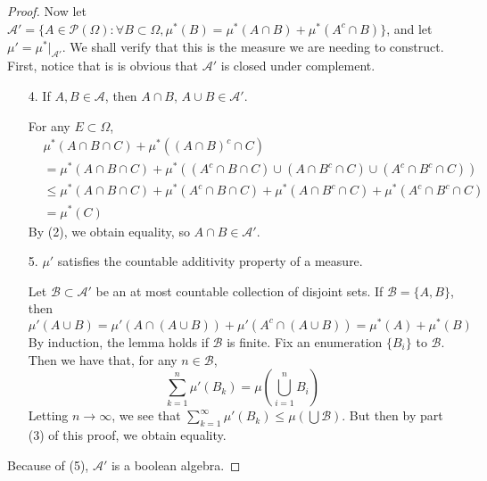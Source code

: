\begin{proof}
    Now let $\mathcal{A}' = \{ A \in \mathcal{P}(\Omega) : \forall B \subset \Omega, \mu^*(B) = \mu^*(A \cap B) + \mu^*(A^c \cap B) \}$, and let $\mu' = \mu^*|_{\mathcal{A}'}$. We shall verify that this is the measure we are needing to construct. First, notice that is is obvious that $\mathcal{A}'$ is closed under complement.

    \begin{enumerate}
        \item[4.] If $A,B \in \mathcal{A}$, then $A \cap B$, $A \cup B \in \mathcal{A}'$.
        \begin{proof*}
            For any $E \subset \Omega$,
            \begin{align*}
                &\mu^*(A \cap B \cap C) + \mu^*((A \cap B)^c \cap C)\\
                &= \mu^*(A \cap B \cap C) + \mu^*((A^c \cap B \cap C) \cup (A \cap B^c \cap C) \cup (A^c \cap B^c \cap C))\\
                &\leq \mu^*(A \cap B \cap C) + \mu^*(A^c \cap B \cap C) + \mu^*(A \cap B^c \cap C) + \mu^*(A^c \cap B^c \cap C)\\
                &= \mu^*(C)
            \end{align*}
            By (2), we obtain equality, so $A \cap B \in \mathcal{A}'$.
        \end{proof*}

        \item[5.] $\mu'$ satisfies the countable additivity property of a measure.
        \begin{proof*}
            Let $\mathcal{B} \subset \mathcal{A}'$ be an at most countable collection of disjoint sets. If $\mathcal{B} = \{ A, B \}$, then
            \[ \mu'(A \cup B) = \mu'(A \cap (A \cup B)) + \mu'(A^c \cap (A \cup B)) = \mu^*(A) + \mu^*(B) \]
            By induction, the lemma holds if $\mathcal{B}$ is finite. Fix an enumeration $\{ B_i \}$ to $\mathcal{B}$. Then we have that, for any $n \in \mathcal{B}$,
            \[ \sum_{k = 1}^n \mu'(B_k) = \mu \left( \bigcup_{i = 1}^n B_i \right) \]
            Letting $n \to \infty$, we see that $\sum_{k = 1}^\infty \mu'(B_k) \leq \mu \left( \bigcup \mathcal{B} \right)$. But then by part (3) of this proof, we obtain equality.
        \end{proof*}
    \end{enumerate}

    Because of (5), $\mathcal{A}'$ is a boolean algebra.


\end{proof}

